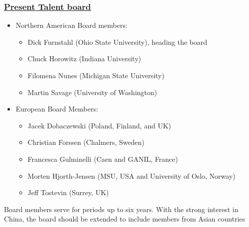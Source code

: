 \documentclass{beamer}
\begin{document}
\begin{frame}
\frametitle{\href{{http://fribtheoryalliance.org/TALENT/content/board.php}}{Present Talent board}}

\begin{block}{}
\begin{itemize}
\item Northern American Board members:
\begin{itemize}

  \item Dick Furnstahl (Ohio State University), heading the board

  \item Chuck Horowitz (Indiana University) 

  \item Filomena Nunes (Michigan State University) 

  \item Martin Savage (University of  Washington) 

\end{itemize}

\noindent
\item European Board Members:
\begin{itemize}

  \item Jacek Dobaczewski (Poland, Finland, and UK) 

  \item Christian Forssen (Chalmers, Sweden) 

  \item Francesca Gulminelli (Caen and GANIL, France) 

  \item Morten Hjorth-Jensen (MSU, USA and University of Oslo, Norway)

  \item Jeff Tostevin (Surrey, UK) 
\end{itemize}

\noindent
\end{itemize}

\noindent
Board members serve for periods up to six years. With the strong interest in China, the board should be extended to include members from Asian countries
\end{block}
\end{frame}
\end{document}
